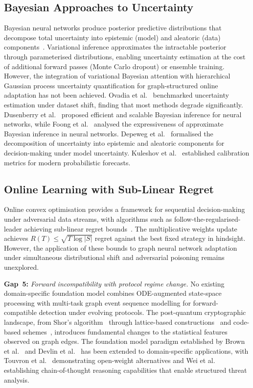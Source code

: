 \subsection{Bayesian Approaches to Uncertainty}

Bayesian neural networks produce posterior predictive distributions that decompose total uncertainty into epistemic (model) and aleatoric (data) components~\cite{Gal2016,Blundell2015,Lakshminarayanan2017,Kendall2017}. Variational inference approximates the intractable posterior through parameterised distributions, enabling uncertainty estimation at the cost of additional forward passes (Monte Carlo dropout) or ensemble training. However, the integration of variational Bayesian attention with hierarchical Gaussian process uncertainty quantification for graph-structured online adaptation has not been achieved. Ovadia et al.~\cite{Ovadia2019} benchmarked uncertainty estimation under dataset shift, finding that most methods degrade significantly. Dusenberry et al.~\cite{Dusenberry2020} proposed efficient and scalable Bayesian inference for neural networks, while Foong et al.~\cite{Foong2019} analysed the expressiveness of approximate Bayesian inference in neural networks. Depeweg et al.~\cite{Depeweg2018} formalised the decomposition of uncertainty into epistemic and aleatoric components for decision-making under model uncertainty. Kuleshov et al.~\cite{Kuleshov2018} established calibration metrics for modern probabilistic forecasts.


\subsection{Online Learning with Sub-Linear Regret}

Online convex optimisation provides a framework for sequential decision-making under adversarial data streams, with algorithms such as follow-the-regularised-leader achieving sub-linear regret bounds~\cite{Shalev2012,Arjovsky2017}. The multiplicative weights update achieves $R(T)\leq\sqrt{T\log|S|}$ regret against the best fixed strategy in hindsight. However, the application of these bounds to graph neural network adaptation under simultaneous distributional shift and adversarial poisoning remains unexplored.

\medskip
\noindent\textbf{Gap~5:} \emph{Forward incompatibility with protocol regime change.} No existing domain-specific foundation model combines ODE-augmented state-space processing with multi-task graph event sequence modelling for forward-compatible detection under evolving protocols. The post-quantum cryptographic landscape, from Shor's algorithm~\cite{Shor1997} through lattice-based constructions~\cite{Ducas2018,Proos2003} and code-based schemes~\cite{McEliece1978}, introduces fundamental changes to the statistical features observed on graph edges. The foundation model paradigm established by Brown et al.~\cite{Brown2020} and Devlin et al.~\cite{Devlin2019} has been extended to domain-specific applications, with Touvron et al.~\cite{Touvron2023} demonstrating open-weight alternatives and Wei et al.~\cite{Wei2022cot} establishing chain-of-thought reasoning capabilities that enable structured threat analysis.

